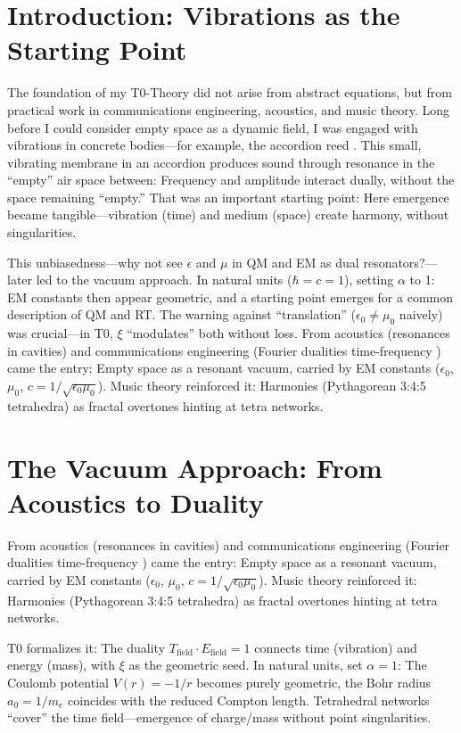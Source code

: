 \section{Introduction: Vibrations as the Starting Point}
	The foundation of my T0-Theory did not arise from abstract equations, but from practical work in communications engineering, acoustics, and music theory. Long before I could consider empty space as a dynamic field, I was engaged with vibrations in concrete bodies—for example, the accordion reed \cite{ricot2005}. This small, vibrating membrane in an accordion produces sound through resonance in the ``empty'' air space between: Frequency and amplitude interact dually, without the space remaining ``empty.'' That was an important starting point: Here emergence became tangible—vibration (time) and medium (space) create harmony, without singularities.
	
	This unbiasedness—why not see $\epsilon$ and $\mu$ in QM and EM as dual resonators?—later led to the vacuum approach. In natural units ($\hbar = c = 1$), setting $\alpha$ to 1: EM constants then appear geometric, and a starting point emerges for a common description of QM and RT. The warning against ``translation'' ($\epsilon_0 \neq \mu_0$ naively) was crucial—in T0, $\xi$ ``modulates'' both without loss. From acoustics (resonances in cavities) and communications engineering (Fourier dualities time-frequency \cite{stanfordEE261}) came the entry: Empty space as a resonant vacuum, carried by EM constants ($\epsilon_0$, $\mu_0$, $c = 1/\sqrt{\epsilon_0 \mu_0}$). Music theory reinforced it: Harmonies (Pythagorean 3:4:5 tetrahedra) as fractal overtones hinting at tetra networks.
	
	\section{The Vacuum Approach: From Acoustics to Duality}
	From acoustics (resonances in cavities) and communications engineering (Fourier dualities time-frequency \cite{stanfordEE261}) came the entry: Empty space as a resonant vacuum, carried by EM constants ($\epsilon_0$, $\mu_0$, $c = 1/\sqrt{\epsilon_0 \mu_0}$). Music theory reinforced it: Harmonies (Pythagorean 3:4:5 tetrahedra) as fractal overtones hinting at tetra networks.
	
	T0 formalizes it: The duality $T_{\text{field}} \cdot E_{\text{field}} = 1$ connects time (vibration) and energy (mass), with $\xi$ as the geometric seed. In natural units, set $\alpha = 1$: The Coulomb potential $V(r) = -1/r$ becomes purely geometric, the Bohr radius $a_0 = 1/m_e$ coincides with the reduced Compton length. Tetrahedral networks ``cover'' the time field—emergence of charge/mass without point singularities.
	
